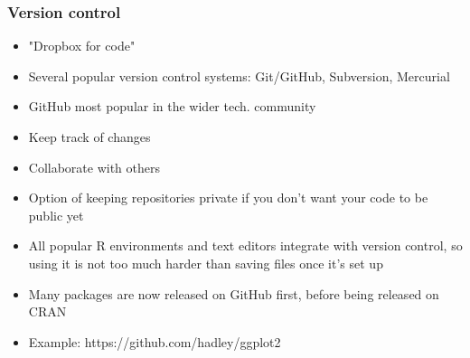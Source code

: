 \documentclass{beamer}
\begin{document}
\begin{frame}
\frametitle{Version control}
\begin{itemize}
\item "Dropbox for code"
\item Several popular version control systems: Git/GitHub, Subversion, Mercurial
\item GitHub most popular in the wider tech. community
\item Keep track of changes
\item Collaborate with others
\item Option of keeping repositories private if you don't want your code to be public yet
\item All popular R environments and text editors integrate with version control, so using it
			is not too much harder than saving files once it's set up
\item Many packages are now released on GitHub first, before being released on CRAN
\item Example: https://github.com/hadley/ggplot2
\end{itemize}
\end{frame}

\end{document}
